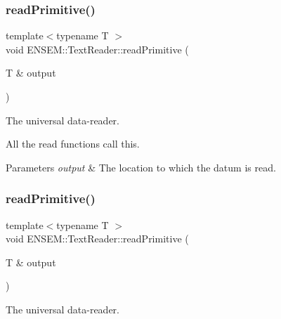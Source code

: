 \mbox{\label{classENSEM_1_1TextReader_afa5fccab911c19d1365a51f39df01d96}} 
\subsubsection{\texorpdfstring{readPrimitive()}{readPrimitive()}\hspace{0.1cm}{\footnotesize\ttfamily [1/3]}}
{\footnotesize\ttfamily template$<$typename T $>$ \\
void E\+N\+S\+E\+M\+::\+Text\+Reader\+::read\+Primitive (\begin{DoxyParamCaption}\item[{T \&}]{output }\end{DoxyParamCaption})\hspace{0.3cm}{\ttfamily [protected]}}



The universal data-\/reader. 

All the read functions call this. 
\begin{DoxyParams}{Parameters}
{\em output} & The location to which the datum is read. \\
\hline
\end{DoxyParams}
\mbox{\label{classENSEM_1_1TextReader_afa5fccab911c19d1365a51f39df01d96}} 
\subsubsection{\texorpdfstring{readPrimitive()}{readPrimitive()}\hspace{0.1cm}{\footnotesize\ttfamily [2/3]}}
{\footnotesize\ttfamily template$<$typename T $>$ \\
void E\+N\+S\+E\+M\+::\+Text\+Reader\+::read\+Primitive (\begin{DoxyParamCaption}\item[{T \&}]{output }\end{DoxyParamCaption})\hspace{0.3cm}{\ttfamily [protected]}}



The universal data-\/reader. 


